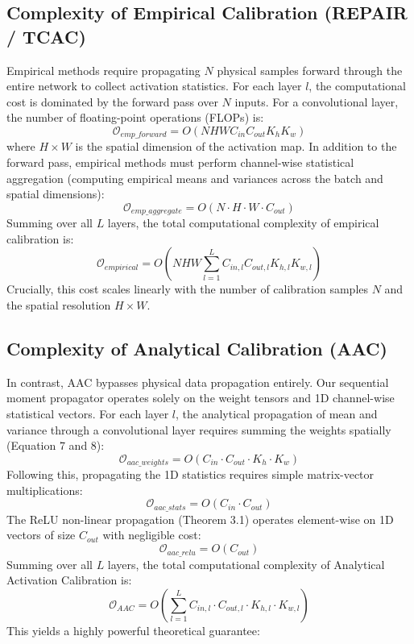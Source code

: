 \documentclass{article}
\theoremstyle{plain}
\theoremstyle{definition}
\theoremstyle{remark}
\begin{document}
\subsection{Complexity of Empirical Calibration (REPAIR / TCAC)}
Empirical methods require propagating $N$ physical samples forward through the entire network to collect activation statistics. For each layer $l$, the computational cost is dominated by the forward pass over $N$ inputs. For a convolutional layer, the number of floating-point operations (FLOPs) is:
\begin{equation}
    \mathcal{O}_{emp\_forward} = O(N H W C_{in} C_{out} K_h K_w)
\end{equation}
where $H \times W$ is the spatial dimension of the activation map. In addition to the forward pass, empirical methods must perform channel-wise statistical aggregation (computing empirical means and variances across the batch and spatial dimensions):
\begin{equation}
    \mathcal{O}_{emp\_aggregate} = O(N \cdot H \cdot W \cdot C_{out})
\end{equation}
Summing over all $L$ layers, the total computational complexity of empirical calibration is:
\begin{equation}
    \mathcal{O}_{empirical} = O\left( N H W \sum_{l=1}^L C_{in, l} C_{out, l} K_{h, l} K_{w, l} \right)
\end{equation}
Crucially, this cost scales linearly with the number of calibration samples $N$ and the spatial resolution $H \times W$. 

\subsection{Complexity of Analytical Calibration (AAC)}
In contrast, AAC bypasses physical data propagation entirely. Our sequential moment propagator operates solely on the weight tensors and 1D channel-wise statistical vectors. For each layer $l$, the analytical propagation of mean and variance through a convolutional layer requires summing the weights spatially (Equation 7 and 8):
\begin{equation}
    \mathcal{O}_{aac\_weights} = O(C_{in} \cdot C_{out} \cdot K_h \cdot K_w)
\end{equation}
Following this, propagating the 1D statistics requires simple matrix-vector multiplications:
\begin{equation}
    \mathcal{O}_{aac\_stats} = O(C_{in} \cdot C_{out})
\end{equation}
The ReLU non-linear propagation (Theorem 3.1) operates element-wise on 1D vectors of size $C_{out}$ with negligible cost:
\begin{equation}
    \mathcal{O}_{aac\_relu} = O(C_{out})
\end{equation}
Summing over all $L$ layers, the total computational complexity of Analytical Activation Calibration is:
\begin{equation}
    \mathcal{O}_{AAC} = O\left( \sum_{l=1}^L C_{in, l} \cdot C_{out, l} \cdot K_{h, l} \cdot K_{w, l} \right)
\end{equation}
This yields a highly powerful theoretical guarantee:
\end{document}
